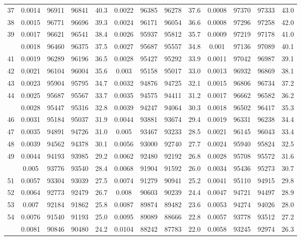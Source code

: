 \documentclass[
  14pt,
]{article}
\begin{document}
\begin{longtable}[t]{lcccccccccccc}
37 & 0.0014 & 96911 & 96841 & 40.3 & 0.0022 & 96385 & 96278 & 37.6 & 0.0008 & 97370 & 97333 & 43.0\\
38 & 0.0015 & 96771 & 96696 & 39.3 & 0.0024 & 96171 & 96054 & 36.6 & 0.0008 & 97296 & 97258 & 42.0\\
39 & 0.0017 & 96621 & 96541 & 38.4 & 0.0026 & 95937 & 95812 & 35.7 & 0.0009 & 97219 & 97178 & 41.0\\
\addlinespace
40 & 0.0018 & 96460 & 96375 & 37.5 & 0.0027 & 95687 & 95557 & 34.8 & 0.001 & 97136 & 97089 & 40.1\\
41 & 0.0019 & 96289 & 96196 & 36.5 & 0.0028 & 95427 & 95292 & 33.9 & 0.0011 & 97042 & 96987 & 39.1\\
42 & 0.0021 & 96104 & 96004 & 35.6 & 0.003 & 95158 & 95017 & 33.0 & 0.0013 & 96932 & 96869 & 38.1\\
43 & 0.0023 & 95904 & 95795 & 34.7 & 0.0032 & 94876 & 94725 & 32.1 & 0.0015 & 96806 & 96734 & 37.2\\
44 & 0.0025 & 95687 & 95567 & 33.7 & 0.0035 & 94575 & 94411 & 31.2 & 0.0017 & 96662 & 96582 & 36.2\\
\addlinespace
45 & 0.0028 & 95447 & 95316 & 32.8 & 0.0039 & 94247 & 94064 & 30.3 & 0.0018 & 96502 & 96417 & 35.3\\
46 & 0.0031 & 95184 & 95037 & 31.9 & 0.0044 & 93881 & 93674 & 29.4 & 0.0019 & 96331 & 96238 & 34.4\\
47 & 0.0035 & 94891 & 94726 & 31.0 & 0.005 & 93467 & 93233 & 28.5 & 0.0021 & 96145 & 96043 & 33.4\\
48 & 0.0039 & 94562 & 94378 & 30.1 & 0.0056 & 93000 & 92740 & 27.7 & 0.0024 & 95940 & 95824 & 32.5\\
49 & 0.0044 & 94193 & 93985 & 29.2 & 0.0062 & 92480 & 92192 & 26.8 & 0.0028 & 95708 & 95572 & 31.6\\
\addlinespace
50 & 0.005 & 93776 & 93540 & 28.4 & 0.0068 & 91904 & 91592 & 26.0 & 0.0034 & 95436 & 95273 & 30.7\\
51 & 0.0057 & 93304 & 93039 & 27.5 & 0.0074 & 91279 & 90941 & 25.2 & 0.0041 & 95110 & 94915 & 29.8\\
52 & 0.0064 & 92773 & 92479 & 26.7 & 0.008 & 90603 & 90239 & 24.4 & 0.0047 & 94721 & 94497 & 28.9\\
53 & 0.007 & 92184 & 91862 & 25.8 & 0.0087 & 89874 & 89482 & 23.6 & 0.0053 & 94274 & 94026 & 28.0\\
54 & 0.0076 & 91540 & 91193 & 25.0 & 0.0095 & 89089 & 88666 & 22.8 & 0.0057 & 93778 & 93512 & 27.2\\
\addlinespace
55 & 0.0081 & 90846 & 90480 & 24.2 & 0.0104 & 88242 & 87783 & 22.0 & 0.0058 & 93245 & 92974 & 26.3\\

\end{longtable}
\end{document}
